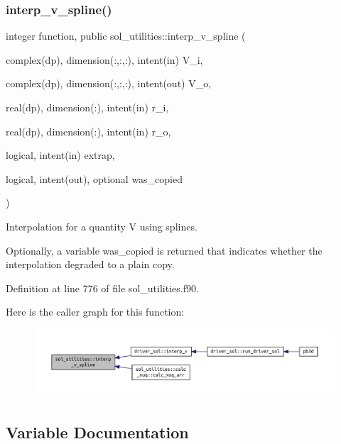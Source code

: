 \subsubsection{\texorpdfstring{interp\+\_\+v\+\_\+spline()}{interp\_v\_spline()}}
{\footnotesize\ttfamily integer function, public sol\+\_\+utilities\+::interp\+\_\+v\+\_\+spline (\begin{DoxyParamCaption}\item[{complex(dp), dimension(\+:,\+:,\+:), intent(in)}]{V\+\_\+i,  }\item[{complex(dp), dimension(\+:,\+:,\+:), intent(out)}]{V\+\_\+o,  }\item[{real(dp), dimension(\+:), intent(in)}]{r\+\_\+i,  }\item[{real(dp), dimension(\+:), intent(in)}]{r\+\_\+o,  }\item[{logical, intent(in)}]{extrap,  }\item[{logical, intent(out), optional}]{was\+\_\+copied }\end{DoxyParamCaption})}



Interpolation for a quantity V using splines. 

Optionally, a variable \textquotesingle{}was\+\_\+copied\textquotesingle{} is returned that indicates whether the interpolation degraded to a plain copy. 

Definition at line 776 of file sol\+\_\+utilities.\+f90.

Here is the caller graph for this function\+:\nopagebreak
\begin{figure}[H]
\begin{center}
\leavevmode
\includegraphics[width=350pt]{namespacesol__utilities_a93969085ad0fce8e530493a412b1ce38_icgraph}
\end{center}
\end{figure}


\subsection{Variable Documentation}
\mbox{\label{namespacesol__utilities_a4779ff845b4ddc046892bf4eb4490dd2}} 

